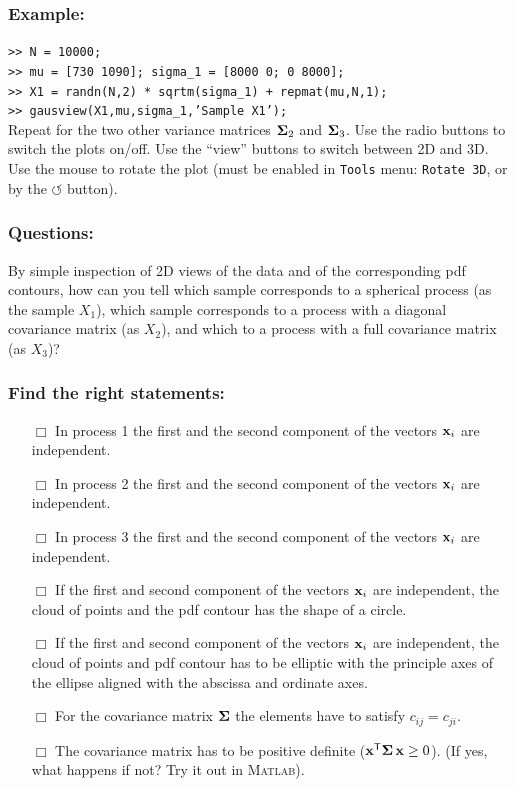 \documentclass[a4paper]{article}
\newcommand{\mat}[1]{{\tt >> #1} \\}
\newcommand{\com}[1]{{\tt #1}}
\newcommand{\trn}{^{\mathsf T}} %
\newcommand{\xv}{\ensuremath\mathbf{x}}  %
\newcommand{\Sm}{\ensuremath\boldsymbol{\Sigma}}  %
\begin{document}
\subsubsection*{Example:}
\mat{N = 10000;}
\mat{mu = [730 1090]; sigma\_1 = [8000 0; 0 8000];}
\mat{X1 = randn(N,2) * sqrtm(sigma\_1) + repmat(mu,N,1);}
\mat{gausview(X1,mu,sigma\_1,'Sample X1');}
%
Repeat for the two other variance matrices $\Sm_2$ and $\Sm_3$.
Use the radio buttons to switch the plots on/off. Use the ``view''
buttons to switch between 2D and 3D. Use the mouse to rotate the plot
(must be enabled in \com{Tools} menu: \com{Rotate 3D}, or by the
$\circlearrowleft$ button).

\subsubsection*{Questions:}
By simple inspection of 2D views of the data and of the corresponding
pdf contours, how can you tell which sample corresponds to a spherical
process (as the sample $X_1$), which sample corresponds to a process
with a diagonal covariance matrix (as $X_2$), and which to a process
with a full covariance matrix (as $X_3$)?

\subsubsection*{Find the right statements:}
\begin{itemize}
\item[$\Box$] In process 1 the first and the second component of the
  vectors $\xv_i$ are independent.
  
\item[$\Box$] In process 2 the first and the second component of the
  vectors $\xv_i$ are independent.
  
\item[$\Box$] In process 3 the first and the second component of the
  vectors $\xv_i$ are independent.
  
\item[$\Box$] If the first and second component of the vectors $\xv_i$
  are independent, the cloud of points and the pdf contour has the
  shape of a circle.
  
\item[$\Box$] If the first and second component of the vectors $\xv_i$
  are independent, the cloud of points and pdf contour has to be
  elliptic with the principle axes of the ellipse aligned with the
  abscissa and ordinate axes.
  
\item[$\Box$] For the covariance matrix $\Sm$ the elements have to
  satisfy $c_{ij} = c_{ji}$.
  
\item[$\Box$] The covariance matrix has to be positive definite
  ($\xv\trn \Sm\, \xv \ge 0$). (If yes, what happens if not? Try it
  out in \textsc{Matlab}).
\end{itemize}
\end{document}
